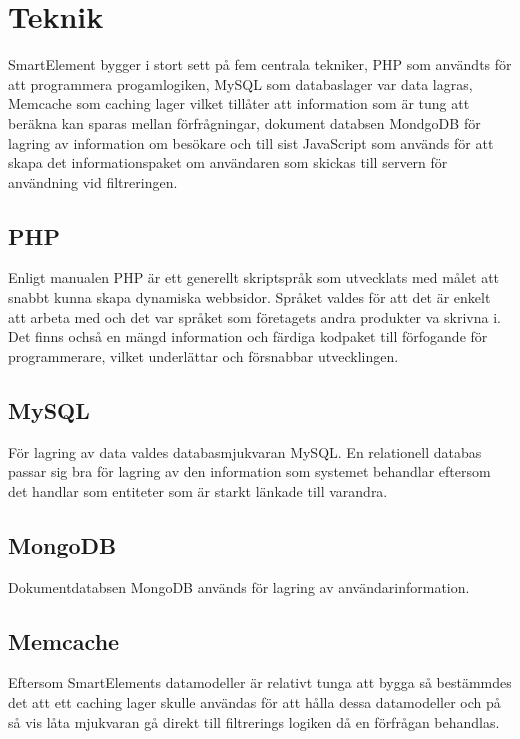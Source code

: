\section{Teknik}

SmartElement bygger i stort sett på fem centrala tekniker, PHP som användts för att programmera progamlogiken, MySQL som databaslager var data lagras, Memcache som caching lager vilket tillåter att information som är tung att beräkna kan sparas mellan förfrågningar, dokument databsen MondgoDB för lagring av information om besökare och till sist JavaScript som används för att skapa det informationspaket om användaren som skickas till servern för användning vid filtreringen.

\subsection{PHP}

Enligt manualen \citep{phpmanual} PHP är ett generellt skriptspråk som utvecklats med målet att snabbt kunna skapa dynamiska webbsidor. Språket valdes för att det är enkelt att arbeta med och det var språket som företagets andra produkter va skrivna i. Det finns ochså en mängd information och färdiga kodpaket till förfogande för programmerare, vilket underlättar och försnabbar utvecklingen.

\subsection{MySQL}

För lagring av data valdes databasmjukvaran MySQL. En relationell databas passar sig bra för lagring av den information som systemet behandlar eftersom det handlar som entiteter som är starkt länkade till varandra.

\subsection{MongoDB}

Dokumentdatabsen MongoDB används för lagring av användarinformation.

\subsection{Memcache}

Eftersom SmartElements datamodeller är relativt tunga att bygga så bestämmdes det att ett caching lager skulle användas för att hålla dessa datamodeller och på så vis låta mjukvaran gå direkt till filtrerings logiken då en förfrågan behandlas.

